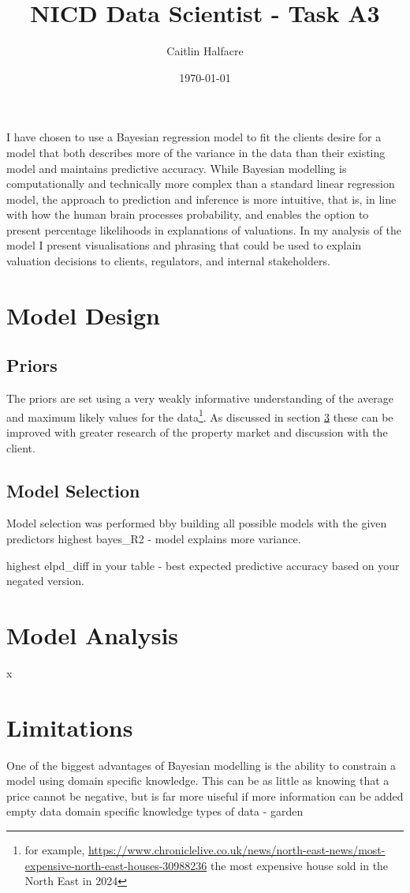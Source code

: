 \documentclass{scrartcl}
\author{Caitlin Halfacre}
\date{\today}
\title{NICD Data Scientist - Task A3}
\begin{document}
\maketitle
I have chosen to use a Bayesian regression model to fit the clients desire for a model that both describes more of the variance in the data than their existing model and maintains predictive accuracy. While Bayesian modelling is computationally and technically more complex than a standard linear regression model, the approach to prediction and inference is more intuitive, that is, in line with how the human brain processes probability, and enables the option to present percentage likelihoods in explanations of valuations. In my analysis of the model I present visualisations and phrasing that could be used to explain valuation decisions to clients, regulators, and internal stakeholders.

\section{Model Design}
\subsection{Priors}
The priors are set using a very weakly informative understanding of the average and maximum likely values for the data\footnote{for example, \url{https://www.chroniclelive.co.uk/news/north-east-news/most-expensive-north-east-houses-30988236} the most expensive house sold in the North East in 2024}. As discussed in section \ref{limitations} these can be improved with greater research of the property market and discussion with the client.


\subsection{Model Selection}
Model selection was performed bby building all possible models with the given predictors
highest bayes\_R2 - model explains more variance.

highest elpd\_diff in your table - best expected predictive accuracy based on your negated version.

\section{Model Analysis}
x

\section{Limitations} \label{limitations}
One of the biggest advantages of Bayesian modelling is the ability to constrain a model using domain specific knowledge. This can be as little as knowing that a price cannot be negative, but is far more uiseful if more information can be added 
empty data
domain specific knowledge
types of data - garden
\end{document}
